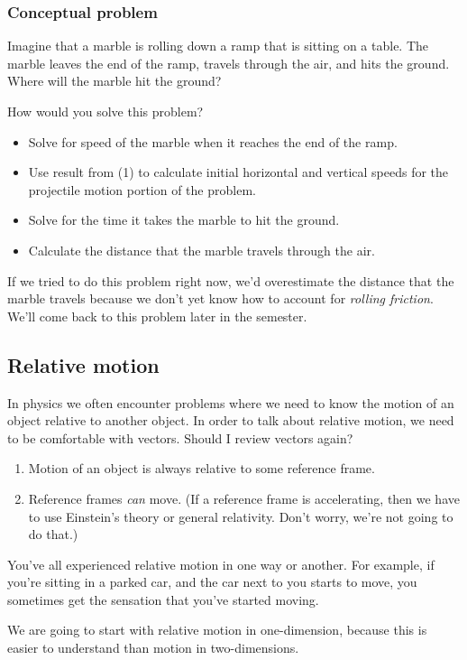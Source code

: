 \subsubsection{Conceptual problem}
Imagine that a marble is rolling down a ramp that is sitting on a table. The marble leaves the end of the ramp, travels through the air, and hits the ground. Where will the marble hit the ground?

How would you solve this problem?
\begin{itemize}
\item Solve for speed of the marble when it reaches the end of the ramp.
\item Use result from (1) to calculate initial horizontal and vertical speeds for the projectile motion portion of the problem.
\item Solve for the time it takes the marble to hit the ground.
\item Calculate the distance that the marble travels through the air.
\end{itemize}

If we tried to do this problem right now, we'd overestimate the distance that the marble travels because we don't yet know how to account for \textit{rolling friction}. We'll come back to this problem later in the semester. 

\subsection{Relative motion}
In physics we often encounter problems where we need to know the motion of an object relative to another object. In order to talk about relative motion, we need to be comfortable with vectors. Should I review vectors again?

\begin{enumerate}
\item Motion of an object is always relative to some reference frame. 
\item Reference frames \textit{can} move. (If a reference frame is accelerating, then we have to use Einstein's theory or general relativity. Don't worry, we're not going to do that.)
\end{enumerate}

You've all experienced relative motion in one way or another. For example, if you're sitting in a parked car, and the car next to you starts to move, you sometimes get the sensation that you've started moving.

We are going to start with relative motion in one-dimension, because this is easier to understand than motion in two-dimensions.

